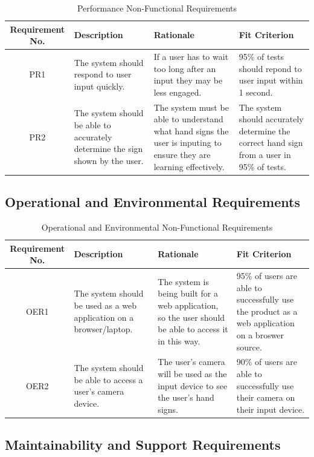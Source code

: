 \documentclass[12pt, titlepage]{article}
\begin{document}
\begin{table}[H]
\caption{Performance Non-Functional Requirements}
\noindent \begin{tabular}{| c | p{3cm}| p{3cm}| p{3cm}|}
\hline 
\textbf{Requirement No.} & \textbf{Description} & \textbf{Rationale} & \textbf{Fit Criterion}\\
\hline
PR1 & The system should respond to user input quickly. & If a user has to wait too long after an input they may be less engaged. & 95\% of tests should repond to user input within 1 second. \\
\hline
PR2 & The system should be able to accurately determine the sign shown by the user. & The system must be able to understand what hand signs the user is inputing to ensure they are learning effectively. & The system should accurately determine the correct hand sign from a user in 95\% of tests. \\
\bottomrule
\end{tabular}
\end{table}

\subsection{Operational and Environmental Requirements}

\begin{table}[H]
\caption{Operational and Environmental Non-Functional Requirements}
\noindent \begin{tabular}{| c | p{3cm}| p{3cm}| p{3cm}|}
\hline 
\textbf{Requirement No.} & \textbf{Description} & \textbf{Rationale} & \textbf{Fit Criterion}\\
\hline
OER1 & The system should be used as a web application on a browser/laptop. & The system is being built for a web application, so the user should be able to access it in this way. & 95\% of users are able to successfully use the product as a web application on a broswer source. \\
\hline
OER2 & The system should be able to access a user's camera device. & The user's camera will be used as the input device to see the user's hand signs. & 90\% of users are able to successfully use their camera on their input device. \\
\bottomrule
\end{tabular}
\end{table}

\subsection{Maintainability and Support Requirements}
\end{document}
